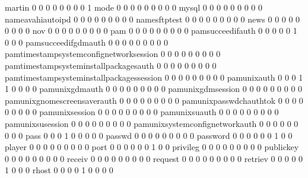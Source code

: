 \documentclass[compress,8pt]{beamer}
\begin{document}
\begin{frame}
\begin{Schunk}
  martin                                     0   0   0   0   0   0   0   0   1
  mode                                       0   0   0   0   0   0   0   0   0
  mysql                                      0   0   0   0   0   0   0   0   0
  nameavahiautoipd                           0   0   0   0   0   0   0   0   0
  namesftptest                               0   0   0   0   0   0   0   0   0
  news                                       0   0   0   0   0   0   0   0   0
  nov                                        0   0   0   0   0   0   0   0   0
  pam                                        0   0   0   0   0   0   0   0   0
  pamsucceedifauth                           0   0   0   0   0   1   0   0   0
  pamsucceedifgdmauth                        0   0   0   0   0   0   0   0   0
  pamtimestampsystemconfignetworksession     0   0   0   0   0   0   0   0   0
  pamtimestampsysteminstallpackagesauth      0   0   0   0   0   0   0   0   0
  pamtimestampsysteminstallpackagessession   0   0   0   0   0   0   0   0   0
  pamunixauth                                0   0   0   1   1   0   0   0   0
  pamunixgdmauth                             0   0   0   0   0   0   0   0   0
  pamunixgdmsession                          0   0   0   0   0   0   0   0   0
  pamunixgnomescreensaverauth                0   0   0   0   0   0   0   0   0
  pamunixpasswdchauthtok                     0   0   0   0   0   0   0   0   0
  pamunixsession                             0   0   0   0   0   0   0   0   0
  pamunixsuauth                              0   0   0   0   0   0   0   0   0
  pamunixsusession                           0   0   0   0   0   0   0   0   0
  pamunixsystemconfignetworkauth             0   0   0   0   0   0   0   0   0
  pass                                       0   0   0   1   0   0   0   0   0
  passwd                                     0   0   0   0   0   0   0   0   0
  password                                   0   0   0   0   0   0   1   0   0
  player                                     0   0   0   0   0   0   0   0   0
  port                                       0   0   0   0   0   0   1   0   0
  privileg                                   0   0   0   0   0   0   0   0   0
  publickey                                  0   0   0   0   0   0   0   0   0
  receiv                                     0   0   0   0   0   0   0   0   0
  request                                    0   0   0   0   0   0   0   0   0
  retriev                                    0   0   0   0   0   1   0   0   0
  rhost                                      0   0   0   0   1   0   0   0   0

\end{Schunk}
\end{frame}
\end{document}
